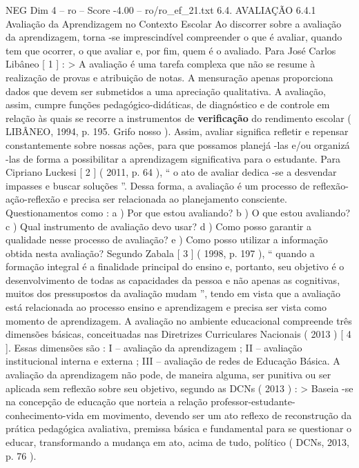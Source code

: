 \begin{textsample}{NEG Dim 4 – ro – Score -4.00 – ro/ro\_ef\_21.txt}  \label{ex:f4_neg_072}
6.4.
AVALIAÇÃO 6.4.1 Avaliação da Aprendizagem no Contexto Escolar Ao discorrer sobre a avaliação da aprendizagem, torna -se imprescindível compreender o que é avaliar, quando tem que ocorrer, o que avaliar e, por fim, quem é o avaliado.
Para José Carlos Libâneo [ 1 ] : > A avaliação é uma tarefa complexa que não se resume à realização de provas e atribuição de notas.
A mensuração apenas proporciona dados que devem ser submetidos a uma apreciação qualitativa.
A avaliação, assim, cumpre funções pedagógico-didáticas, de diagnóstico e de controle em relação às quais se recorre a instrumentos de \textbf{verificação} do rendimento escolar ( LIBÂNEO, 1994, p. 195.
Grifo nosso ).
Assim, avaliar significa refletir e repensar constantemente sobre nossas ações, para que possamos planejá -las e/ou organizá -las de forma a possibilitar a aprendizagem significativa para o estudante.
Para Cipriano Luckesi [ 2 ] ( 2011, p. 64 ), “ o ato de avaliar dedica -se a desvendar impasses e buscar soluções ”.
Dessa forma, a avaliação é um processo de reflexão-ação-reflexão e precisa ser relacionada ao planejamento consciente.
Questionamentos como : a ) Por que estou avaliando? b ) O que estou avaliando? c ) Qual instrumento de avaliação devo usar? d ) Como posso garantir a qualidade nesse processo de avaliação? e ) Como posso utilizar a informação obtida nesta avaliação?
Segundo Zabala [ 3 ] ( 1998, p. 197 ), “ quando a formação integral é a finalidade principal do ensino e, portanto, seu objetivo é o desenvolvimento de todas as capacidades da pessoa e não apenas as cognitivas, muitos dos pressupostos da avaliação mudam ”, tendo em vista que a avaliação está relacionada ao processo ensino e aprendizagem e precisa ser vista como momento de aprendizagem.
A avaliação no ambiente educacional compreende três dimensões básicas, conceituadas nas Diretrizes Curriculares Nacionais ( 2013 ) [ 4 ].
Essas dimensões são : I – avaliação da aprendizagem ; II – avaliação institucional interna e externa ; III – avaliação de redes de Educação Básica.
A avaliação da aprendizagem não pode, de maneira alguma, ser punitiva ou ser aplicada sem reflexão sobre seu objetivo, segundo as DCNs ( 2013 ) : > Baseia -se na concepção de educação que norteia a relação professor-estudante-conhecimento-vida em movimento, devendo ser um ato reflexo de reconstrução da prática pedagógica avaliativa, premissa básica e fundamental para se questionar o educar, transformando a mudança em ato, acima de tudo, político ( DCNs, 2013, p. 76 ).

\end{textsample}
